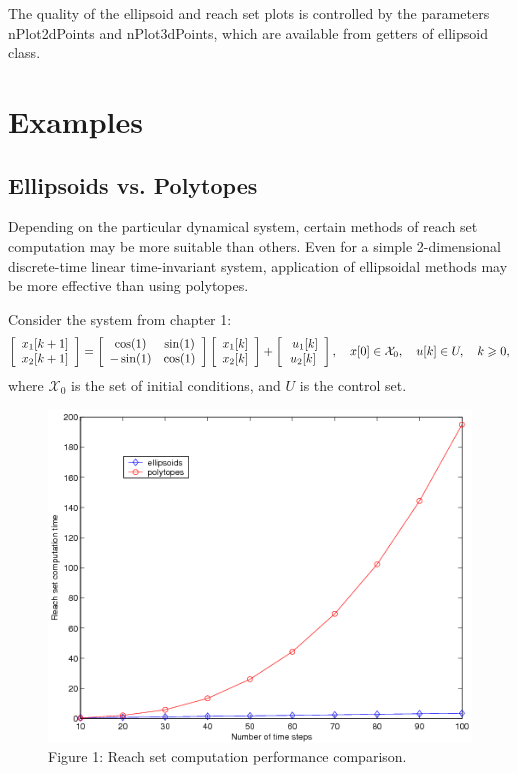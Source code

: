 \documentclass[letterpaper,10pt,english]{sphinxmanual}
\begin{document}
The quality of the ellipsoid and reach set plots is controlled by the
parameters nPlot2dPoints and nPlot3dPoints, which are available from
getters of ellipsoid class.


\chapter{Examples}
\label{chap_examples::doc}\label{chap_examples:examples}

\section{Ellipsoids vs. Polytopes}
\label{chap_examples:ellipsoids-vs-polytopes}
Depending on the particular dynamical system, certain methods of reach
set computation may be more suitable than others. Even for a simple
2-dimensional discrete-time linear time-invariant system, application of
ellipsoidal methods may be more effective than using polytopes.

Consider the system from chapter 1:
\begin{gather}
\begin{split}\left[\begin{array}{c}
x_1[k+1]\\
x_2[k+1]\end{array}\right] = \left[\begin{array}{cc}
\cos(1) & \sin(1)\\
-\sin(1) & \cos(1)\end{array}\right]\left[\begin{array}{c}
x_1[k]\\
x_2[k]\end{array}\right] + \left[\begin{array}{c}\
u_1[k]\\
u_2[k]\end{array}\right], ~~~ x[0]\in{\mathcal X}_0, ~~~ u[k]\in U, ~~~ k\geqslant0,\end{split}\notag
\end{gather}
where \({\mathcal X}_0\) is the set of initial conditions, and
\(U\) is the control set.
\begin{figure}[htbp]
\centering
\capstart

\includegraphics[width=0.500\linewidth]{chapter06_section01_ellpoly.png}
\caption{Figure 1: Reach set computation performance comparison.}\label{chap_examples:ellpolyfig}\end{figure}
\end{document}
